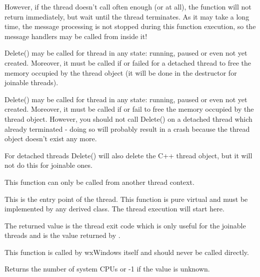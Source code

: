 However, if the thread doesn't call  
often enough (or at all), the function will not return immediately, but wait
until the thread terminates. As it may take a long time, the message processing
is not stopped during this function execution, so the message handlers may be
called from inside it!

Delete() may be called for thread in any state: running, paused or even not yet
created. Moreover, it must be called if  or 
 failed for a detached thread to free the memory
occupied by the thread object (it will be done in the destructor for joinable
threads).

Delete() may be called for thread in any state: running, paused or even not yet created. Moreover,
it must be called if  or  fail to free
the memory occupied by the thread object. However, you should not call Delete()
on a detached thread which already terminated - doing so will probably result
in a crash because the thread object doesn't exist any more.

For detached threads Delete() will also delete the C++ thread object, but it
will not do this for joinable ones.

This function can only be called from another thread context.

\label{wxthreadentry}


This is the entry point of the thread. This function is pure virtual and must
be implemented by any derived class. The thread execution will start here.

The returned value is the thread exit code which is only useful for the
joinable threads and is the value returned by .

This function is called by wxWindows itself and should never be called
directly.

\label{wxthreadgetcpucount}


Returns the number of system CPUs or -1 if the value is unknown.



\label{wxthreadgetid}

